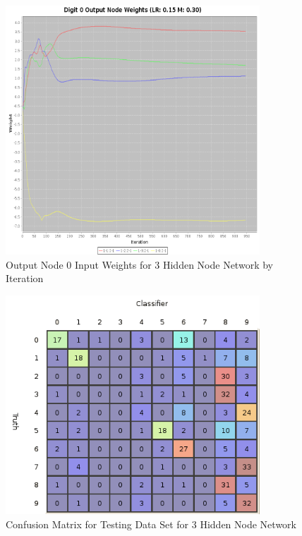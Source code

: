 \documentclass{article}
\begin{document}
\begin{figure}
\centering
\includegraphics[width=0.85\textwidth]{data/final/3_hidden_node_0weight.png}
\caption{Output Node 0 Input Weights for 3 Hidden Node Network by Iteration}
\label{weight3}
\end{figure}

\begin{figure}
\centering
\includegraphics[width=0.85\textwidth]{data/final/3_test_confusion.png}
\caption{Confusion Matrix for Testing Data Set for 3 Hidden Node Network}
\label{testconfusion3}
\end{figure}
\end{document}
